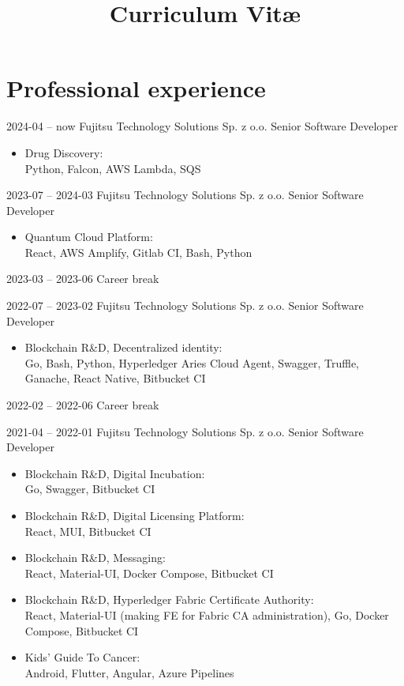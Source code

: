 \documentclass[11pt,a4paper,sans,english]{moderncv}   %
\title{Curriculum Vit\ae{}}
\begin{document}
\makecvtitle

\vspace{-1.6cm}

\section{Professional experience}

\cventry
{\small2024-04 -- now}
	{Fujitsu Technology Solutions Sp. z o.o.}{}{}
	{Senior Software Developer}
	{\begin{itemize}
		\item Drug Discovery: \\
			Python, Falcon, AWS Lambda, SQS
	\end{itemize}}

\cventry
{\small2023-07 -- 2024-03}
	{Fujitsu Technology Solutions Sp. z o.o.}{}{}
	{Senior Software Developer}
	{\begin{itemize}
		\item Quantum Cloud Platform: \\
			React, AWS Amplify, Gitlab CI, Bash, Python
	\end{itemize}}

\cventry
{\small2023-03 -- 2023-06}
	{Career break}{}{}{}{}

\cventry
{\small2022-07 -- 2023-02}
	{Fujitsu Technology Solutions Sp. z o.o.}{}{}
	{Senior Software Developer}
	{\begin{itemize}
		\item Blockchain R\&D, Decentralized identity: \\
			 Go, Bash, Python, Hyperledger Aries Cloud Agent, Swagger, Truffle,
			 Ganache, React Native, Bitbucket CI
	\end{itemize}}

\cventry
{\small2022-02 -- 2022-06}
	{Career break}{}{}{}{}

\cventry
{\small2021-04 -- 2022-01}
	{Fujitsu Technology Solutions Sp. z o.o.}{}{}
	{Senior Software Developer}
	{\begin{itemize}
		\item Blockchain R\&D, Digital Incubation: \\
			Go, Swagger, Bitbucket CI
		\item Blockchain R\&D, Digital Licensing Platform: \\
			React, MUI, Bitbucket CI
		\item Blockchain R\&D, Messaging: \\
			React, Material-UI, Docker Compose, Bitbucket CI
		\item Blockchain R\&D, Hyperledger Fabric Certificate Authority: \\
			React, Material-UI (making FE for Fabric CA administration), Go,
			Docker Compose, Bitbucket CI
		\item Kids' Guide To Cancer: \\
			Android, Flutter, Angular, Azure Pipelines
	\end{itemize}}
\end{document}
